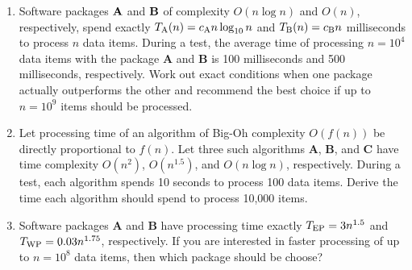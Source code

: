 \documentclass[]{article}
\begin{document}
\begin{enumerate}
\item Software
packages ${\bf A}$ and ${\bf B}$ of
complexity $O(n \log n )$ and
$O(n)$, respectively, spend exactly 
$T_{\rm A}(n) = c_{\rm A}n \log_{10} n$
and $T_{\rm B}(n) = c_{\rm B} n$ milliseconds to process
\(n\) data items. During a test,
the average time of processing $n=10^{4}$ 
data items with the package {\bf A} and {\bf B} is
100 milliseconds and 500 milliseconds, respectively. 
Work out exact conditions when one package
actually outperforms the other and recommend the best choice if
up to $n = 10^{9}$ items should be processed. 

\item Let processing time of an algorithm of Big-Oh complexity \(O(f(n))\)
be directly proportional to \(f(n)\).  Let
three such algorithms \textbf{A}, \textbf{B}, and \textbf{C}                     
have time complexity \(O(n^{2})\), \(O(n^{1.5})\), and \(O(n \log n )\),
respectively.            
During a test, each algorithm spends 10 seconds to process          
100 data items. Derive the time each algorithm should    
spend to process 10,000 items.        

\item 
Software packages \textbf{A} and \textbf{B} have processing time
exactly \(T_{\rm EP}= 3n^{1.5}\) and
\(T_{\rm WP}= 0.03 n^{1.75}\), respectively.
If you are interested in faster processing of up to 
\(n = 10^{8}\) data items, then which package should be 
choose? \\
\end{enumerate}
\end{document}
